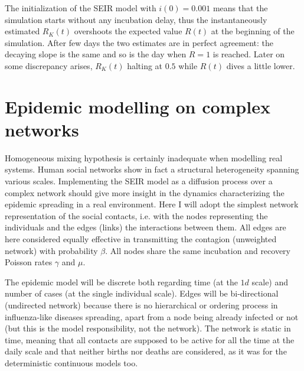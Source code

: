 \documentclass[DIV=12, BCOR=0pt]{scrartcl}  %
\begin{document}
	The initialization of the SEIR model with $i(0) = 0.001$ means that the simulation starts without any incubation delay, thus the instantaneously estimated $R_K(t)$ overshoots the expected value $R(t)$ at the beginning of the simulation. After few days the two estimates are in perfect agreement: the decaying slope is the same and so is the day when $R = 1$ is reached. Later on some discrepancy arises, $R_K(t)$ halting at $0.5$ while $R(t)$ dives a little lower.
 
  

  
  \section{Epidemic modelling on complex networks}
  \label{sec:network}
  Homogeneous mixing hypothesis is certainly inadequate when modelling real systems. Human social networks show in fact a structural heterogeneity spanning various scales. Implementing the SEIR model as a diffusion process over a complex network should give more insight in the dynamics characterizing the epidemic spreading in a real environment. Here I will adopt the simplest network representation of the social contacts, i.e. with the nodes representing the individuals and the edges (links) the interactions between them. All edges are here considered equally effective in transmitting the contagion (unweighted network) with probability $\beta$. All nodes share the same incubation and recovery Poisson rates $\gamma$ and $\mu$. 
  
  The epidemic model will be discrete both regarding time (at the $1 d$ scale) and number of cases (at the single individual scale). Edges will be bi-directional (undirected network) because there is no hierarchical or ordering process in influenza-like diseases spreading, apart from a node being already infected or not (but this is the model responsibility, not the network). The network is static in time, meaning that all contacts are supposed to be active for all the time at the daily scale and that neither births nor deaths are considered, as it was for the deterministic continuous models too. 
  
\end{document}
